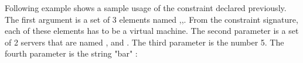 Following example shows a sample usage of the constraint  declared previously.
The first argument is a set of 3 elements named ,,. From the constraint signature, each of these elements has to be a virtual machine.
The second parameter is a set of 2 servers that are named , and .
The third parameter is the number 5.
The fourth parameter is the string "bar" :

\smallskip
{}

